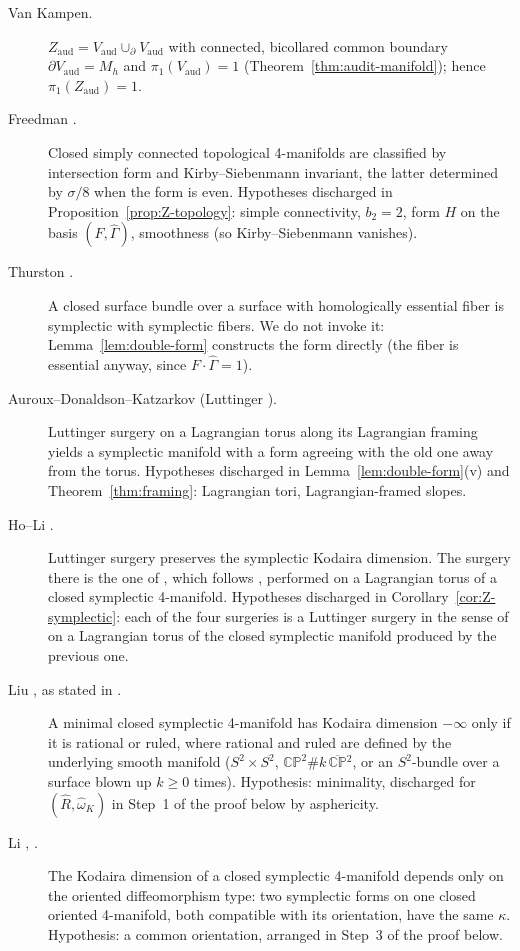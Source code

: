 \documentclass[11pt]{article}
\newcommand{\CP}{\mathbb{CP}}
\newcommand{\pione}{\pi_1}
\theoremstyle{definition}
\begin{document}
\begin{description}
\item[Van Kampen.] $Z_{\mathrm{aud}}=V_{\mathrm{aud}}\cup_{\partial}V_{\mathrm{aud}}$
 with connected, bicollared common boundary $\partial V_{\mathrm{aud}}=M_h$
 and $\pione(V_{\mathrm{aud}})=1$ (Theorem~\ref{thm:audit-manifold});
 hence $\pione(Z_{\mathrm{aud}})=1$.
\item[Freedman \cite{Freedman}.] Closed simply connected topological
 4-manifolds are classified by intersection form and Kirby--Siebenmann
 invariant, the latter determined by $\sigma/8$ when the form is even.
 Hypotheses discharged in Proposition~\ref{prop:Z-topology}: simple
 connectivity, $b_2=2$, form $H$ on the basis $(F,\hat\Gamma)$,
 smoothness (so Kirby--Siebenmann vanishes).
\item[Thurston \cite{Thurston}.] A closed surface bundle over a surface with
 homologically essential fiber is symplectic with symplectic fibers.  We do
 not invoke it: Lemma~\ref{lem:double-form} constructs the form directly
 (the fiber is essential anyway, since $F\cdot\hat\Gamma=1$).
\item[Auroux--Donaldson--Katzarkov \cite{ADK} (Luttinger \cite{Luttinger}).]
 Luttinger surgery on a Lagrangian torus along its Lagrangian framing yields
 a symplectic manifold with a form agreeing with the old one away from the
 torus.  Hypotheses discharged in Lemma~\ref{lem:double-form}(v) and
 Theorem~\ref{thm:framing}: Lagrangian tori, Lagrangian-framed slopes.
\item[{Ho--Li \cite[Theorem~1.1]{HoLi}.}] Luttinger surgery preserves the
 symplectic Kodaira dimension.  The surgery there is the one of
 \cite[Section~2.1]{HoLi}, which follows \cite{ADK}, performed on a
 Lagrangian torus of a closed symplectic 4-manifold.  Hypotheses discharged
 in Corollary~\ref{cor:Z-symplectic}: each of the four surgeries is a
 Luttinger surgery in the sense of \cite[Definition~2.1]{ADK} on a
 Lagrangian torus of the closed symplectic manifold produced by the
 previous one.
\item[{Liu \cite{Liu}, as stated in \cite[Theorem~2.4(2)]{LiClay}.}] A
 minimal closed symplectic 4-manifold has Kodaira dimension $-\infty$ only
 if it is rational or ruled, where rational and ruled are defined by the
 underlying smooth manifold ($S^2\times S^2$, $\CP^2\#k\,\overline{\CP}{}^2$,
 or an $S^2$-bundle over a surface blown up $k\ge0$ times).  Hypothesis:
 minimality, discharged for $(\hat R,\hat\omega_K)$ in Step~1 of the proof
 below by asphericity.
\item[{Li \cite{Li}, \cite[p.~251]{LiClay}.}] The Kodaira dimension of a
 closed symplectic 4-manifold depends only on the oriented diffeomorphism
 type: two symplectic forms on one closed oriented 4-manifold, both
 compatible with its orientation, have the same $\kappa$.  Hypothesis: a
 common orientation, arranged in Step~3 of the proof below.
\end{description}
\end{document}
